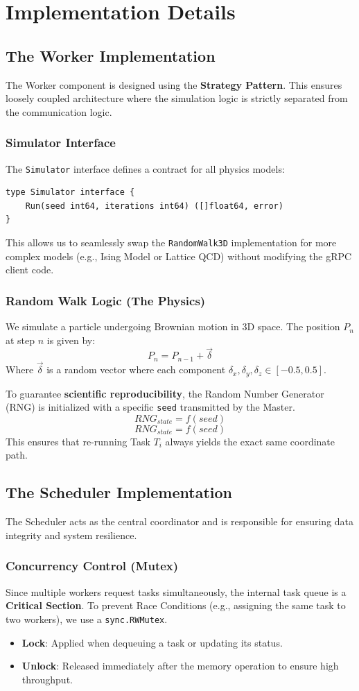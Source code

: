\section{Implementation Details}

\subsection{The Worker Implementation}
The Worker component is designed using the \textbf{Strategy Pattern}. This ensures loosely coupled architecture where the simulation logic is strictly separated from the communication logic.

\subsubsection{Simulator Interface}
The \texttt{Simulator} interface defines a contract for all physics models:
\begin{verbatim}
type Simulator interface {
    Run(seed int64, iterations int64) ([]float64, error)
}
\end{verbatim}
This allows us to seamlessly swap the \texttt{RandomWalk3D} implementation for more complex models (e.g., Ising Model or Lattice QCD) without modifying the gRPC client code.

\subsubsection{Random Walk Logic (The Physics)}
We simulate a particle undergoing Brownian motion in 3D space. The position $P_n$ at step $n$ is given by:
\[
P_n = P_{n-1} + \vec{\delta}
\]
Where $\vec{\delta}$ is a random vector where each component $\delta_x, \delta_y, \delta_z \in [-0.5, 0.5]$.

To guarantee \textbf{scientific reproducibility}, the Random Number Generator (RNG) is initialized with a specific \texttt{seed} transmitted by the Master.
\[
RNG_{state} = f(seed)
\]
\[
RNG_{state} = f(seed)
\]
This ensures that re-running Task $T_i$ always yields the exact same coordinate path.

\subsection{The Scheduler Implementation}
The Scheduler acts as the central coordinator and is responsible for ensuring data integrity and system resilience.

\subsubsection{Concurrency Control (Mutex)}
Since multiple workers request tasks simultaneously, the internal task queue is a \textbf{Critical Section}. To prevent Race Conditions (e.g., assigning the same task to two workers), we use a \texttt{sync.RWMutex}.
\begin{itemize}
    \item \textbf{Lock}: Applied when dequeuing a task or updating its status.
    \item \textbf{Unlock}: Released immediately after the memory operation to ensure high throughput.
\end{itemize}

